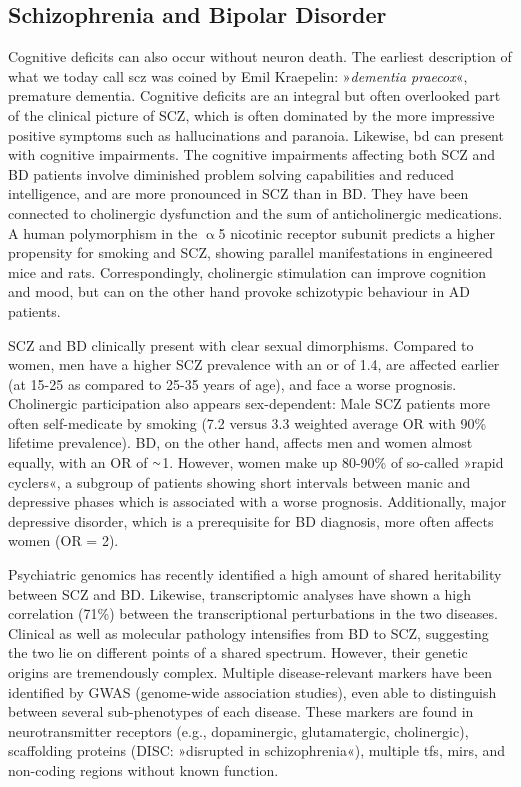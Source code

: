 \subsection{Schizophrenia and Bipolar Disorder} 
Cognitive deficits can also occur without neuron death. The earliest description of what we today call \ac{scz} was coined by Emil Kraepelin: »\emph{dementia praecox}«, premature dementia.\cite{Kraepelin1913} Cognitive deficits are an integral but often overlooked part of the clinical picture of SCZ, which is often dominated by the more impressive positive symptoms such as hallucinations and paranoia. Likewise, \ac{bd} can present with cognitive impairments. The cognitive impairments affecting both SCZ and BD patients involve diminished problem solving capabilities and reduced intelligence, and are more pronounced in SCZ than in BD.\cite{Bortolato2015} They have been connected to cholinergic dysfunction\cite{VanEnkhuizen2015, Smucny2017} and the sum of anticholinergic medications.\cite{Gray2015, Eum2017} A human polymorphism in the $\upalpha$5 nicotinic receptor subunit predicts a higher propensity for smoking and SCZ, showing parallel manifestations in engineered mice\cite{Koukouli2017} and rats.\cite{Forget2018} Correspondingly, cholinergic stimulation can improve cognition\cite{Sacco2004, Rowe2015, Lewis2017} and mood,\cite{Higley2014} but can on the other hand provoke schizotypic behaviour in AD patients.\cite{Degirmenci2016}

SCZ and BD clinically present with clear sexual dimorphisms. Compared to women, men have a higher SCZ prevalence with an \ac{or} of 1.4, are affected earlier (at 15-25 as compared to 25-35 years of age), and face a worse prognosis.\cite{Leger2016} Cholinergic participation also appears sex-dependent: Male SCZ patients more often self-medicate by smoking (7.2 versus 3.3 weighted average OR with 90\% lifetime prevalence).\cite{DeLeon2005} BD, on the other hand, affects men and women almost equally, with an OR of $\smallsim$\num{1}. However, women make up 80-90\% of so-called »rapid cyclers«, a subgroup of patients showing short intervals between manic and depressive phases which is associated with a worse prognosis.\cite{Berger2014} Additionally, major depressive disorder, which is a prerequisite for BD diagnosis, more often affects women (OR = 2).\cite{Bekker2007}

Psychiatric genomics has recently identified a high amount of shared heritability between SCZ and BD.\cite{Anttila2018} Likewise, transcriptomic analyses have shown a high correlation (71\%) between the transcriptional perturbations in the two diseases.\cite{Gandal2018} Clinical as well as molecular pathology intensifies from BD to SCZ, suggesting the two lie on different points of a shared spectrum. However, their genetic origins are tremendously complex. Multiple disease-relevant markers have been identified by GWAS (genome-wide association studies), even able to distinguish between several sub-phenotypes of each disease.\cite{Ruderfer2018} These markers are found in neurotransmitter receptors (e.g., dopaminergic, glutamatergic, cholinergic), scaffolding proteins (DISC: »disrupted in schizophrenia«), multiple \acp{tf}, \acp{mir}, and non-coding regions without known function.\cite{Harrison2015, Henriksen2017, Kanazawa2017}

